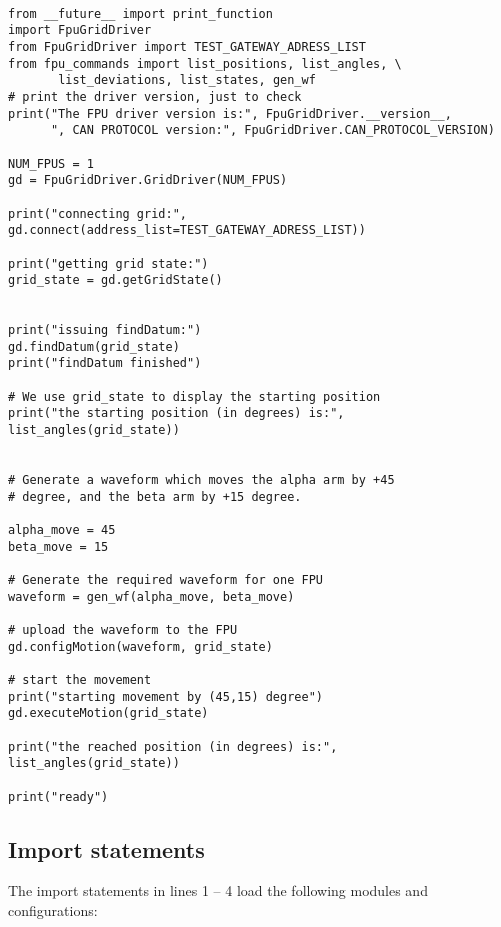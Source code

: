 \documentclass{scrartcl}[12pt,a4paper]
\begin{document}
\begin{verbatim}

from __future__ import print_function
import FpuGridDriver
from FpuGridDriver import TEST_GATEWAY_ADRESS_LIST
from fpu_commands import list_positions, list_angles, \
       list_deviations, list_states, gen_wf
# print the driver version, just to check
print("The FPU driver version is:", FpuGridDriver.__version__,
      ", CAN PROTOCOL version:", FpuGridDriver.CAN_PROTOCOL_VERSION)

NUM_FPUS = 1
gd = FpuGridDriver.GridDriver(NUM_FPUS)

print("connecting grid:", gd.connect(address_list=TEST_GATEWAY_ADRESS_LIST))

print("getting grid state:")
grid_state = gd.getGridState()


print("issuing findDatum:")
gd.findDatum(grid_state)
print("findDatum finished")

# We use grid_state to display the starting position
print("the starting position (in degrees) is:", list_angles(grid_state))


# Generate a waveform which moves the alpha arm by +45
# degree, and the beta arm by +15 degree. 

alpha_move = 45
beta_move = 15

# Generate the required waveform for one FPU
waveform = gen_wf(alpha_move, beta_move)

# upload the waveform to the FPU
gd.configMotion(waveform, grid_state)

# start the movement
print("starting movement by (45,15) degree")
gd.executeMotion(grid_state)

print("the reached position (in degrees) is:", list_angles(grid_state))

print("ready")

\end{verbatim}


\subsection{Import statements}

The import statements in lines 1 -- 4 load the following modules and
configurations:
\end{document}
